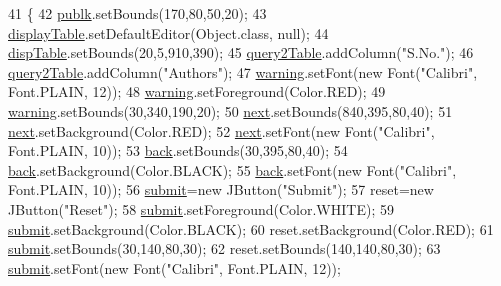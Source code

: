 \begin{DoxyCode}
41                            \{
42         \hyperlink{classGuiQuery2_aadf0bcfdb4aa2bad406378cf07be0c24}{publk}.setBounds(170,80,50,20);
43         \hyperlink{classGuiQuery2_af15c62d5c9199ea2fdf2de7442495c72}{displayTable}.setDefaultEditor(Object.class, null);
44         \hyperlink{classGuiQuery2_abba8f10b666db3ea7653c3f6a647fb60}{dispTable}.setBounds(20,5,910,390);
45         \hyperlink{classGuiQuery2_a0b3f16b0f92eabbdea82f4abd3ba4377}{query2Table}.addColumn(\textcolor{stringliteral}{"S.No."});
46         \hyperlink{classGuiQuery2_a0b3f16b0f92eabbdea82f4abd3ba4377}{query2Table}.addColumn(\textcolor{stringliteral}{"Authors"});
47         \hyperlink{classGuiQuery2_ab813118a2db6297717b32f054e5305e9}{warning}.setFont(\textcolor{keyword}{new} Font(\textcolor{stringliteral}{"Calibri"}, Font.PLAIN, 12));
48         \hyperlink{classGuiQuery2_ab813118a2db6297717b32f054e5305e9}{warning}.setForeground(Color.RED);
49         \hyperlink{classGuiQuery2_ab813118a2db6297717b32f054e5305e9}{warning}.setBounds(30,340,190,20);
50         \hyperlink{classGuiQuery2_a2a63533eaacb408e66da8beb1738b140}{next}.setBounds(840,395,80,40);
51         \hyperlink{classGuiQuery2_a2a63533eaacb408e66da8beb1738b140}{next}.setBackground(Color.RED);
52         \hyperlink{classGuiQuery2_a2a63533eaacb408e66da8beb1738b140}{next}.setFont(\textcolor{keyword}{new} Font(\textcolor{stringliteral}{"Calibri"}, Font.PLAIN, 10));
53         \hyperlink{classGuiQuery2_adb82d5a5b40c916e957bddbca80efb4b}{back}.setBounds(30,395,80,40);
54         \hyperlink{classGuiQuery2_adb82d5a5b40c916e957bddbca80efb4b}{back}.setBackground(Color.BLACK);
55         \hyperlink{classGuiQuery2_adb82d5a5b40c916e957bddbca80efb4b}{back}.setFont(\textcolor{keyword}{new} Font(\textcolor{stringliteral}{"Calibri"}, Font.PLAIN, 10));
56         \hyperlink{classGUIQuery_a6580b15e365bc754c1a5ccdd2d58a4bb}{submit}=\textcolor{keyword}{new} JButton(\textcolor{stringliteral}{"Submit"});
57         reset=\textcolor{keyword}{new} JButton(\textcolor{stringliteral}{"Reset"});
58         \hyperlink{classGUIQuery_a6580b15e365bc754c1a5ccdd2d58a4bb}{submit}.setForeground(Color.WHITE);
59         \hyperlink{classGUIQuery_a6580b15e365bc754c1a5ccdd2d58a4bb}{submit}.setBackground(Color.BLACK);
60         reset.setBackground(Color.RED);
61         \hyperlink{classGUIQuery_a6580b15e365bc754c1a5ccdd2d58a4bb}{submit}.setBounds(30,140,80,30);
62         reset.setBounds(140,140,80,30);
63         \hyperlink{classGUIQuery_a6580b15e365bc754c1a5ccdd2d58a4bb}{submit}.setFont(\textcolor{keyword}{new} Font(\textcolor{stringliteral}{"Calibri"}, Font.PLAIN, 12));

\end{DoxyCode}
